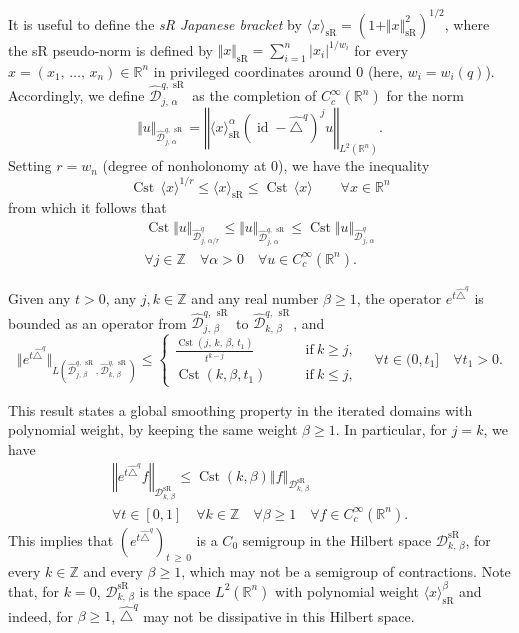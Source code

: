\documentclass[AHL,Unicode,published]{cedram}
\newcommand*\R{\mathbb{R}}
\newcommand*\Z{\mathbb{Z}}
\newcommand{\calD}{\mathcal{D}}
\DeclareMathOperator{\Cst}{Cst}
\DeclareMathOperator{\id}{id}
\DeclareMathOperator{\sR}{sR}
\renewcommand{\geq}{\geqslant}
\renewcommand{\leq}{\leqslant}
\let\oldforall\forall
\renewcommand*{\forall}{\mathrel{\oldforall}}
\begin{document}
It is useful to define the \emph{sR Japanese bracket} by $\langle x\rangle_{\sR} = (1+\Vert x\Vert_{\sR}^2)^{1/2}$, where the sR pseudo-norm is defined by $\Vert x\Vert_{\sR} = \sum_{i=1}^n \vert x_i\vert^{1/w_i}$ for every $x=(x_1,\,\ldots,\,x_n)\in\R^n$ in privileged coordinates around $0$ (here, $w_i=w_i(q)$). Accordingly, we define $\widehat{\calD}_{j,\,\alpha}^{q,\sR}$ as the completion of $C_c^\infty(\R^n)$ for the norm
\[
\Vert u\Vert_{\widehat{\calD}_{j,\,\alpha}^{q,\,\sR}} = \left\Vert \langle x\rangle_{\sR}^\alpha\left(\id - \widehat{\triangle}^q\right)^j u\right\Vert_{L^2\left(\R^n\right)}.
\]
Setting $r=w_n$ (degree of nonholonomy at $0$), we have the inequality
\[
\Cst\, \langle x\rangle^{1/r} \leq \langle x\rangle_{\sR} \leq \Cst\, \langle x\rangle\qquad \forall x\in\R^n
\]
from which it follows that
\begin{multline}\label{equivDjalpha}
\Cst \Vert u\Vert_{\widehat{\calD}^q_{j,\,\alpha/r}} \leq \Vert u\Vert_{\widehat{\calD}_{j,\,\alpha}^{q,\,\sR}} \leq \Cst \Vert u\Vert_{\widehat{\calD}^q_{j,\,\alpha}} \\
\forall j\in\Z\quad\forall\alpha>0\quad\forall u\in C_c^\infty(\R^n).
\end{multline}


\begin{prop}\label{prop_globreg_poidsfixe}
Given any $t>0$, any $j,k\in\Z$ and any real number $\beta\geq 1$, the operator $e^{t\widehat{\triangle}^q}$ is bounded as an operator from $\widehat{\calD}^{q,\,\sR}_{j,\,\beta}$ to $\widehat{\calD}^{q,\,\sR}_{k,\,\beta}$, and
\begin{equation}\label{estim_domainhat}
\Vert e^{t\widehat{\triangle}^q}\Vert_{L\left(\widehat{\calD}_{j,\,\beta}^{q,\,\sR},\widehat{\calD}_{k,\,\beta}^{q,\,\sR}\right)} \leq
\begin{cases}
\frac{\Cst\left(j,\,k,\,\beta,\,t_1\right)}{t^{k-j}} \qquad & \text{if}\ k\geq j, \\[2mm]
\Cst(k,\beta,t_1) \qquad & \text{if}\ k\leq j,
\end{cases}
\quad \forall t\in(0,t_1]\quad\forall t_1>0.
\end{equation}
\end{prop}

This result states a global smoothing property in the iterated domains with polynomial weight, by keeping the same weight $\beta\geq 1$. In particular, for $j=k$, we have
\begin{multline}\label{15:34}
\left\Vert e^{t\widehat{\triangle}^q} f\right\Vert_{\calD_{k,\,\beta}^{\sR}}
\leq \Cst(k,\beta) \left\Vert f\right\Vert_{\calD_{k,\,\beta}^{\sR}} \\
\forall t\in[0,1] \quad \forall k\in\Z\quad\forall\beta\geq 1\quad \forall f\in C_c^\infty(\R^n).
\end{multline}
This implies that $(e^{t\widehat{\triangle}^q})_{t\,\geq\,0}$ is a $C_0$ semigroup in the Hilbert space $\calD_{k,\,\beta}^{\sR}$, for every $k\in\Z$ and every $\beta\geq 1$, which may not be a semigroup of contractions. Note that, for $k=0$, $\calD_{k,\,\beta}^{\sR}$ is the space $L^2(\R^n)$ with polynomial weight $\langle x\rangle_{\sR}^\beta$ and indeed, for $\beta\geq 1$, $\widehat{\triangle}^q$ may not be dissipative in this Hilbert space.
\end{document}
